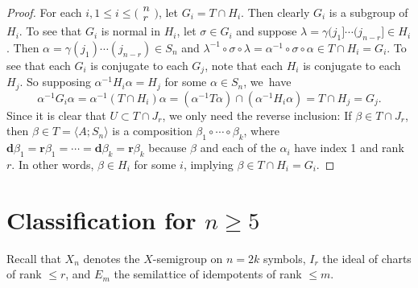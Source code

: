 \documentclass{surv-l}
\numberwithin{equation}{section}
\numberwithin{table}{section}
\numberwithin{figure}{section}
\theoremstyle{definition}
\begin{document}
\begin{proof} For each $i,  1\leq i\leq \big(\!\begin{smallmatrix}
n\\
r \end{smallmatrix}\!\big)$, let $G_{i}=T\cap H_{i}$. Then clearly
$G_{i}$ is a subgroup of $H_{i}$. To see that $G_{i}$ is normal in
$H_{i}$, let $\sigma\in G_{i}$ and suppose
$\lambda=\gamma(j_{1}]\cdots(j_{n-r}]\in H_{i}$. Then
$\alpha=\gamma(j_{1})\cdots(j_{n-r})\in S_{n}$ and
$\lambda^{-1}\circ\sigma \circ\lambda= \alpha^{-1}\circ\sigma
\circ\alpha\in T\cap H_{i}=G_{i}$. To see that each $G_{i}$ is
conjugate to each $G_{j}$, note that each $H_{i}$ is conjugate to
each $H_{j}$. So supposing $\alpha^{-1}H_{i}\alpha=H_{j}$ for some
$\alpha\in S_{n}$, we~have
\[
\alpha^{-1}G_{i}\alpha=\alpha^{-1}(T\cap
H_{i})\alpha=(\alpha^{-1}T\alpha)\cap(\alpha^{-1}H_{i}\alpha)=T\cap
H_{j}=G_{j}.
\]
Since it is clear that $U\subset T\cap J_{r}$, we only need the
reverse inclusion: If $\beta\in T\cap J_{r}$, then $\beta\in
T=\langle A;S_{n}\rangle$ is a composition $\beta_{1}\circ\cdots
\circ\beta_{k}$, where
$\mathbf{d}\beta_{1}=\mathbf{r}\beta_{1}=\cdots=\mathbf{d}\beta_{k}=\mathbf{r}\beta_{k}$
because $\beta$ and each of the $\alpha_{i}$ have index 1 and
rank~$r$. In other words, $\beta\in H_{i}$ for some $i$, implying
$\beta\in T\cap H_{i}=G_{i}.$
\end{proof}

\section{Classification for $n \geq 5$}\label{sec7.33}

Recall that $X_{n}$ denotes the $X$-semigroup on $n=2k$ symbols,
$I_{r}$ the ideal of charts of rank $\leq r$, and $E_{m}$ the
semilattice of idempotents of rank $\leq m$.
\end{document}
